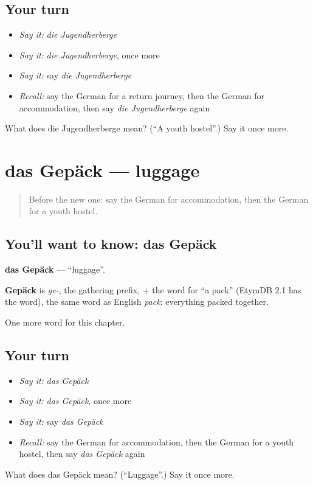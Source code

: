 \subsection*{Your turn}
\begin{itemize}
\raggedright
  \item \emph{Say it:} \emph{die Jugendherberge}
  \item \emph{Say it:} \emph{die Jugendherberge}, once more
  \item \emph{Say it:} say \emph{die Jugendherberge}
  \item \emph{Recall:} say the German for a return journey, then the German for accommodation, then say \emph{die Jugendherberge} again
\end{itemize}

\begin{tcolorbox}[breakable,colback=teal!4,colframe=teal!35!black,title={Before you move on}]
What does die Jugendherberge mean? (\textquotedblleft{}A youth hostel\textquotedblright{}.) Say it once more.
\end{tcolorbox}
\section[das Gepäck]{das Gepäck — luggage}

\label{lesson:GE-C193-gepaeck}



\begin{quote}
Before the new one: say the German for accommodation, then the German for a youth hostel.
\end{quote}

\subsection*{You'll want to know: das Gepäck}
\textbf{das Gepäck} — \textquotedblleft{}luggage\textquotedblright{}.

\begin{cousinweb}
\textbf{Gepäck} is \emph{ge-}, the gathering prefix, + the word for \textquotedblleft{}a pack\textquotedblright{} (EtymDB 2.1 has the word), the same word as English \emph{pack}: everything packed together.
\end{cousinweb}

\begin{grammarlens}[title={What you've built}]
One more word for this chapter.
\end{grammarlens}

\subsection*{Your turn}
\begin{itemize}
\raggedright
  \item \emph{Say it:} \emph{das Gepäck}
  \item \emph{Say it:} \emph{das Gepäck}, once more
  \item \emph{Say it:} say \emph{das Gepäck}
  \item \emph{Recall:} say the German for accommodation, then the German for a youth hostel, then say \emph{das Gepäck} again
\end{itemize}

\begin{tcolorbox}[breakable,colback=teal!4,colframe=teal!35!black,title={Before you move on}]
What does das Gepäck mean? (\textquotedblleft{}Luggage\textquotedblright{}.) Say it once more.
\end{tcolorbox}
